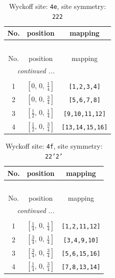 \documentclass[fleqn,8pt]{jsarticle}
\begin{document}
\renewcommand{\arraystretch}{1.2}
\begin{longtable}{ccc}
\caption{Wyckoff site: {\tt 4e}, site symmetry: {\tt 222}}
 \\
 \hline \hline
No. & position & mapping \\ \hline \endfirsthead

\multicolumn{2}{l}{\tablename\ \thetable{}} \\
 \hline \hline
No. & position & mapping \\ \hline \endhead

 \hline \hline
\multicolumn{2}{r}{\footnotesize\it continued ...} \\ \endfoot

 \hline \hline
\multicolumn{2}{r}{} \\ \endlastfoot

1 & $\left[ 0,\, 0,\, \frac{1}{4} \right]$ & {\tt [1,2,3,4]} \\ \hline
2 & $\left[ 0,\, 0,\, \frac{3}{4} \right]$ & {\tt [5,6,7,8]} \\ \hline
3 & $\left[ \frac{1}{2},\, 0,\, \frac{1}{4} \right]$ & {\tt [9,10,11,12]} \\ \hline
4 & $\left[ \frac{1}{2},\, 0,\, \frac{3}{4} \right]$ & {\tt [13,14,15,16]} \\
\end{longtable}
\renewcommand{\arraystretch}{1.2}
\begin{longtable}{ccc}
\caption{Wyckoff site: {\tt 4f}, site symmetry: {\tt 22'2'}}
 \\
 \hline \hline
No. & position & mapping \\ \hline \endfirsthead

\multicolumn{2}{l}{\tablename\ \thetable{}} \\
 \hline \hline
No. & position & mapping \\ \hline \endhead

 \hline \hline
\multicolumn{2}{r}{\footnotesize\it continued ...} \\ \endfoot

 \hline \hline
\multicolumn{2}{r}{} \\ \endlastfoot

1 & $\left[ \frac{1}{4},\, 0,\, \frac{1}{4} \right]$ & {\tt [1,2,11,12]} \\ \hline
2 & $\left[ \frac{3}{4},\, 0,\, \frac{1}{4} \right]$ & {\tt [3,4,9,10]} \\ \hline
3 & $\left[ \frac{3}{4},\, 0,\, \frac{3}{4} \right]$ & {\tt [5,6,15,16]} \\ \hline
4 & $\left[ \frac{1}{4},\, 0,\, \frac{3}{4} \right]$ & {\tt [7,8,13,14]} \\
\end{longtable}
\end{document}
